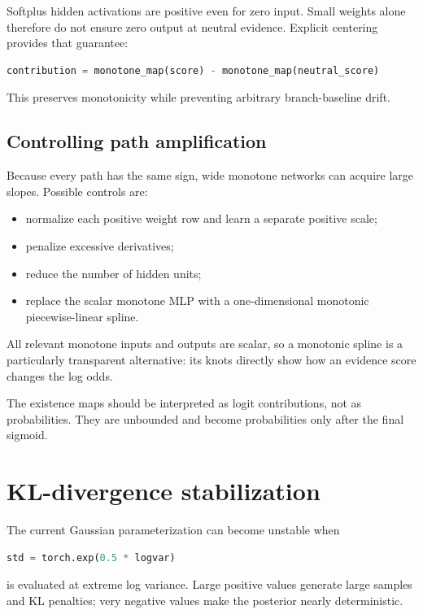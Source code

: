 \documentclass[11pt,a4paper]{article}
\begin{document}
Softplus hidden activations are positive even for zero input. Small weights alone
therefore do not ensure zero output at neutral evidence. Explicit centering
provides that guarantee:

\begin{lstlisting}[language=Python]
contribution = monotone_map(score) - monotone_map(neutral_score)
\end{lstlisting}

This preserves monotonicity while preventing arbitrary branch-baseline drift.

\subsection{Controlling path amplification}

Because every path has the same sign, wide monotone networks can acquire large
slopes. Possible controls are:

\begin{itemize}
  \item normalize each positive weight row and learn a separate positive scale;
  \item penalize excessive derivatives;
  \item reduce the number of hidden units;
  \item replace the scalar monotone MLP with a one-dimensional monotonic
        piecewise-linear spline.
\end{itemize}

All relevant monotone inputs and outputs are scalar, so a monotonic spline is a
particularly transparent alternative: its knots directly show how an evidence
score changes the log odds.

The existence maps should be interpreted as logit contributions, not as
probabilities. They are unbounded and become probabilities only after the final
sigmoid.

\section{KL-divergence stabilization}

The current Gaussian parameterization can become unstable when

\begin{lstlisting}[language=Python]
std = torch.exp(0.5 * logvar)
\end{lstlisting}

is evaluated at extreme log variance. Large positive values generate large
samples and KL penalties; very negative values make the posterior nearly
deterministic.
\end{document}
